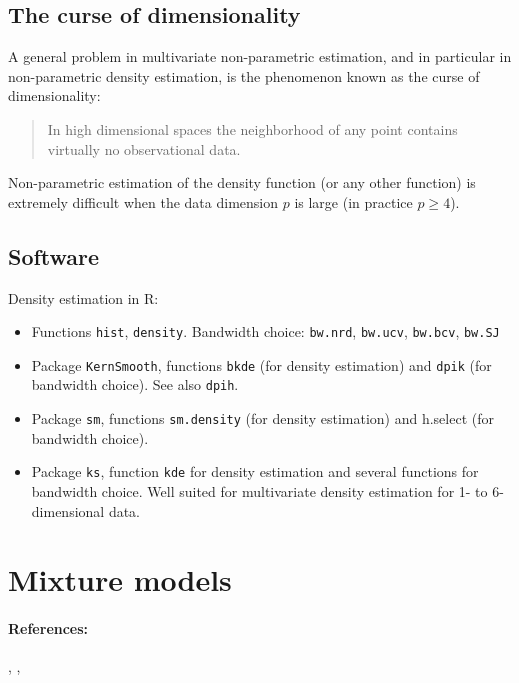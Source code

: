 \subsection{The curse of dimensionality}
A general problem in multivariate non-parametric estimation, and in
particular in non-parametric density estimation, is the phenomenon
known as the curse of dimensionality:
\begin{quote}
	In high dimensional spaces the neighborhood of any point contains
	virtually no observational data.
\end{quote}

\begin{marker}
	Non-parametric estimation of the density function (or any other
	function) is extremely difficult when the data dimension $p$ is large
	(in practice $p \geq 4$).
\end{marker}

\subsection{Software}
Density estimation in R:
\begin{itemize}
	\item Functions \texttt{hist}, \texttt{density}. Bandwidth choice: \texttt{bw.nrd}, \texttt{bw.ucv},
	      \texttt{bw.bcv}, \texttt{bw.SJ}
	\item Package \texttt{KernSmooth}, functions \texttt{bkde} (for density estimation) and
	      \texttt{dpik} (for bandwidth choice). See also \texttt{dpih}. \cite{wand_kernel_1994}
	\item Package \texttt{sm}, functions \texttt{sm.density} (for density estimation) and
	      h.select (for bandwidth choice). \cite{bowman_applied_1997}
	\item Package \texttt{ks}, function \texttt{kde} for density estimation and several
	      functions for bandwidth choice. Well suited for multivariate density
	      estimation for 1- to 6-dimensional data. \cite{chacon_multivariate_2018}
\end{itemize}

\pagebreak
\section{Mixture models}
\paragraph{References:} \cite[Sections 6.8 and 12.7]{hastie_elements_2009}, \cite[Section 13.1.3]{fan_statistical_2020}, \cite[Chapter 10]{lange_numerical_1999}

